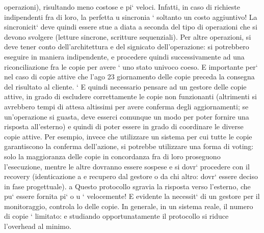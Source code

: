 \documentclass[a4paper,12pt]{article}
\begin{document}
operazioni), risultando meno costose
e pi` veloci. Infatti, in caso di richieste indipendenti fra di loro, la perfetta
u
sincronia ` soltanto un costo aggiuntivo! La sincronicit` deve quindi essere stue
a
diata a seconda del tipo di operazioni che si devono svolgere (letture sincrone,
scritture sequenziali). Per altre operazioni, si deve tener conto dell'architettura
e del signicato dell'operazione: si potrebbero eseguire in maniera indipendente,
e procedere quindi successivamente ad una riconciliazione fra le copie per avere
`
uno stato univoco coeso. E importante per` nel caso di copie attive che l'ago
23
giornamento delle copie preceda la consegna del risultato al cliente.
`
E quindi necessario pensare ad un gestore delle copie attive, in grado di escludere correttamente le copie non
funzionanti (altrimenti si avrebbero tempi
di attesa altissimi per avere conferma degli aggiornamenti; se un'operazione si
guasta, deve esserci comunque un modo per poter fornire una risposta all'esterno) e quindi di poter essere in grado di
coordinare le diverse copie attive. Per
esempio, invece che utilizzare un sistema per cui tutte le copie garantiscono la
conferma dell'azione, si potrebbe utilizzare una forma di voting: solo la maggioranza delle copie in concordanza fra di
loro proseguono l'esecuzione, mentre le
altre dovranno essere sospese e si dovr` procedere con il recovery (identicazione
a
e recupero dal gestore o da chi altro: dovr` essere deciso in fase progettuale).
a
Questo protocollo sgravia la risposta verso l'esterno, che pu` essere fornita pi`
o
u
`
velocemente! E evidente la necessit` di un gestore per il monitoraggio, controla
lo delle copie. In generale, in un sistema reale, il numero di copie ` limitato:
e
studiando opportunatamente il protocollo si riduce l'overhead al minimo.
\end{document}
